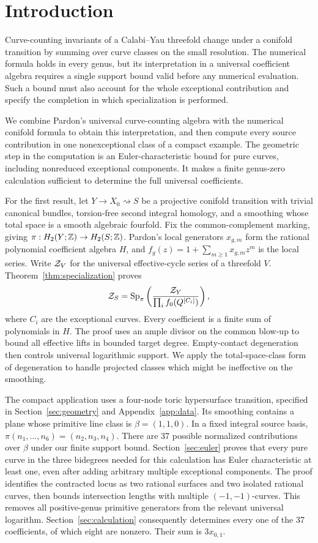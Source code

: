 \section{Introduction}

Curve-counting invariants of a Calabi--Yau threefold change under a
conifold transition by summing over curve classes on the small
resolution. The numerical formula holds in every genus, but its
interpretation in a universal coefficient algebra requires a single
support bound valid before any numerical evaluation. Such a bound
must also account for the whole exceptional contribution and specify
the completion in which specialization is performed.

We combine Pardon's universal curve-counting algebra with the
numerical conifold formula to obtain this interpretation, and then
compute every source contribution in one nonexceptional class of a
compact example. The geometric step in the computation is an
Euler-characteristic bound for pure curves, including nonreduced
exceptional components. It makes a finite genus-zero calculation
sufficient to determine the full universal coefficients.

For the first result, let $Y\to X_0\rightsquigarrow S$ be a
projective conifold transition with trivial canonical bundles,
torsion-free second integral homology, and a smoothing whose total
space is a smooth algebraic fourfold. Fix the common-complement
marking, giving $\pi:H_2(Y;\mathbb Z)\to H_2(S;\mathbb Z)$. Pardon's local
generators $x_{g,m}$ form the rational polynomial coefficient
algebra $H$, and $f_g(z)=1+\sum_{m\ge1}x_{g,m}z^m$ is the local
series. Write $\mathcal Z_V$ for the universal effective-cycle series of a
threefold $V$. Theorem~\ref{thm:specialization} proves
\[
 \mathcal Z_S=\operatorname{Sp}_\pi\left(\frac{\mathcal Z_Y}{\prod_i f_0(Q^{[C_i]})}\right),
\]
where $C_i$ are the exceptional curves. Every coefficient is a finite
sum of polynomials in $H$. The proof uses an ample divisor on the
common blow-up to bound all effective lifts in bounded target degree.
Empty-contact degeneration then controls universal logarithmic
support. We apply the total-space-class form of degeneration to
handle projected classes which might be ineffective on the smoothing.

The compact application uses a four-node toric hypersurface
transition, specified in Section~\ref{sec:geometry} and
Appendix~\ref{app:data}. Its smoothing contains a plane whose
primitive line class is $\beta=(1,1,0)$. In a fixed integral source
basis, $\pi(n_1,\ldots,n_6)=(n_2,n_3,n_4)$. There are 37 possible
normalized contributions over $\beta$ under our finite support
bound. Section~\ref{sec:euler} proves that every pure curve in the
three bidegrees needed for this calculation has Euler characteristic
at least one, even after adding arbitrary multiple exceptional
components. The proof identifies the contracted locus as two
rational surfaces and two isolated rational curves, then bounds
intersection lengths with multiple $(-1,-1)$-curves. This removes
all positive-genus primitive generators from the relevant universal
logarithm. Section~\ref{sec:calculation} consequently determines
every one of the 37 coefficients, of which eight are nonzero.
Their sum is $3x_{0,1}$.

